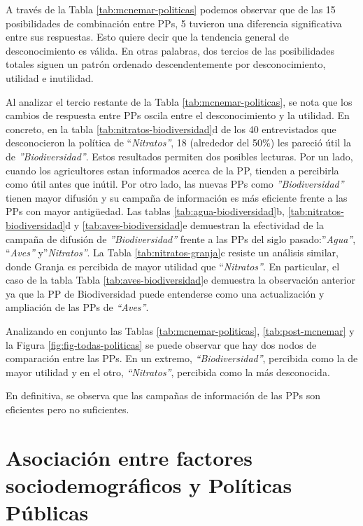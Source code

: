 \documentclass[a4paper, nobind]{templates/ociamthesis}
\begin{document}
A través de la Tabla \ref{tab:mcnemar-politicas} podemos observar que de las 15 posibilidades de combinación entre PPs, 5 tuvieron una diferencia significativa entre sus respuestas.
Esto quiere decir que la tendencia general de desconocimiento es válida.
En otras palabras, dos tercios de las posibilidades totales siguen un patrón ordenado descendentemente por desconocimiento, utilidad e inutilidad.

Al analizar el tercio restante de la Tabla \ref{tab:mcnemar-politicas}, se nota que los cambios de respuesta entre PPs oscila entre el desconocimiento y la utilidad.
En concreto, en la tabla \ref{tab:nitratos-biodiversidad}d de los 40 entrevistados que desconocieron la política de ``\emph{Nitratos''}, 18 (alrededor del 50\%) les pareció útil la de \emph{''Biodiversidad''}.
Estos resultados permiten dos posibles lecturas.
Por un lado, cuando los agricultores estan informados acerca de la PP, tienden a percibirla como útil antes que inútil.
Por otro lado, las nuevas PPs como \emph{''Biodiversidad''} tienen mayor difusión y su campaña de información es más eficiente frente a las PPs con mayor antigüedad.
Las tablas \ref{tab:agua-biodiversidad}b, \ref{tab:nitratos-biodiversidad}d y \ref{tab:aves-biodiversidad}e demuestran la efectividad de la campaña de difusión de \emph{''Biodiversidad''} frente a las PPs del siglo pasado:''\emph{Agua''}, ``\emph{Aves''} y''\emph{Nitratos''}.
La Tabla \ref{tab:nitratos-granja}c resiste un análisis similar, donde Granja es percibida de mayor utilidad que ``\emph{Nitratos''}.
En particular, el caso de la tabla Tabla \ref{tab:aves-biodiversidad}e demuestra la observación anterior ya que la PP de Biodiversidad puede entenderse como una actualización y ampliación de las PPs de \emph{``Aves''}.

Analizando en conjunto las Tablas \ref{tab:mcnemar-politicas}, \ref{tab:post-mcnemar} y la Figura \ref{fig:fig-todas-politicas} se puede observar que hay dos nodos de comparación entre las PPs.
En un extremo, \emph{``Biodiversidad''}, percibida como la de mayor utilidad y en el otro, \emph{``Nitratos''}, percibida como la más desconocida.

En definitiva, se observa que las campañas de información de las PPs son eficientes pero no suficientes.

\hypertarget{asociaciuxf3n-entre-factores-sociodemogruxe1ficos-y-poluxedticas-puxfablicas}{%
\section{Asociación entre factores sociodemográficos y Políticas Públicas}\label{asociaciuxf3n-entre-factores-sociodemogruxe1ficos-y-poluxedticas-puxfablicas}}
\end{document}
